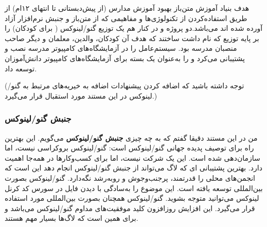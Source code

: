 \begin{itemize}
هدف بنیاد آموزش متن‌باز بهبود آموزش مدارس (از پیش‌دبستانی تا انتهای ۱۲ام)
از طریق استفاده‌کردن از تکنولوژی‌ها و مفاهیمی که از متن‌باز و جنبش نرم‌افزار آزاد
آورده شده اند می‌باشد.دو پروژه  و  در کنار هم یک توزیع گنو/لینوکس
(
برای کودکان) را بر پایه توزیع
که
نام داشت ساختند که هدف آن کودکان، والدین، معلمان و دیگر صاحب منصبان مدرسه بود.
سیستم‌عامل را در آزمایشگاه‌های کامپیوتر مدرسه نصب و پشتیبانی می‌کرد و
را به‌عنوان یک بسته
برای آزمایشگاه‌های کامپیوتر دانش‌آموزان توسعه داد.

\end{itemize}

(توجه داشته باشید که اضافه کردن پیشنهادات اضافه به خیریه‌های
مرتبط به گنو/لینوکس در این مستند مورد استقبال قرار می‌گیرد.)

\subsubsection{جنبش گنو/لینوکس}

من در این مستند دقیقا گفتم که به چه چیزی 
{\bfseries جنبش گنو/لینوکس}
می‌گویم. این بهترین راه برای توصیف پدیده جهانی گنو/لینوکس است:
گنو/لینوکس بروکراسی نیست، اما سازمان‌دهی شده است. این یک شرکت نیست،
اما برای کسب‌وکارها در همه‌جا اهمیت دارد. بهترین پشتیبانی ای که لاگ
می‌تواند از جنبش گنو/لینوکس انجام دهد این است که انجمن‌های محلی را قدرتمند،
پرجنب‌وجوش و روبه‌رشد نگه‌دارد.
گنو/لینوکس بصورت بین‌المللی توسعه یافته است. این موضوع را به‌سادگی
با دیدن فایل  در سورس کد کرنل لینوکس می‌توانید متوجه بشوید.
گنو/لینوکس همچنان بصورت بین‌المللی مورد استفاده قرار می‌گیرد.
این افزایش روزافزون
کلید موفقیت‌های مداوم گنو/لینوکس می‌باشد و برای همین است که لاگ‌ها بسیار مهم هستند.


